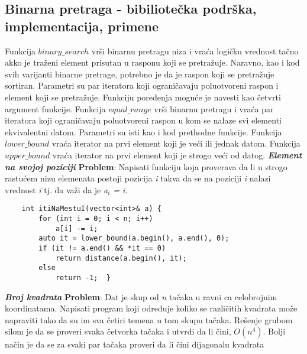 \documentclass{article}
\begin{document}
\subsection{Binarna pretraga - bibiliotečka podrška, implementacija, primene}
Funkcija $binary\_search$ vrši binarnu pretragu niza i vraća logičku vrednost
tačno akko je traženi element prisutan u rasponu koji se pretražuje.
Naravno, kao i kod svih varijanti binarne pretrage, potrebno je da je raspon
koji se pretražuje sortiran. Parametri su par iteratora koji ograničavaju
poluotvoreni raspon i element koji se pretražuje. Funkciju poređenja
moguće je navesti kao četvrti argument funkcije.
\newline Funkcija $equal\_range$ vrši binarnu pretragu i vraća par iteratora koji
ograničavaju poluotvoreni raspon u kom se nalaze svi elementi ekvivalentni
datom. Parametri su isti kao i kod prethodne funkcije.
\newline Funkcija $lower\_bound$ vraća iterator na prvi element koji je veći ili jednak
datom. 
\newline Funkcija $upper\_bound$ vraća iterator na prvi element koji je strogo veći
od datog.
\vspace{0.2cm}\newline
\textit{\textbf{Element na svojoj poziciji}}
\vspace{0.1cm}\newline
\textbf{Problem}: Napisati funkciju koja proverava da li u strogo rastućem nizu elemenata postoji pozicija \textit{i} takva da se na poziciji \textit{i} nalazi vrednost \textit{i} tj. da važi da
je \textit{a$_i$ = i}.
\begin{lstlisting}
    int itiNaMestuI(vector<int>& a) {
        for (int i = 0; i < n; i++)
            a[i] -= i;
        auto it = lower_bound(a.begin(), a.end(), 0);
        if (it != a.end() && *it == 0)
            return distance(a.begin(), it);
        else
            return -1;  }
\end{lstlisting}
\textit{\textbf{Broj kvadrata}}
\vspace{0.1cm}\newline
\textbf{Problem}: Dat je skup od \textit{n} tačaka u ravni ca celobrojnim koordinatama.
Napisati program koji određuje koliko se različitih kvadrata može napraviti tako
da su im sva četiri temena u tom skupu tačaka.
\newline
Rešenje grubom silom je da se proveri svaka četvorka tačaka i utvrdi da li čini, $O(n^4)$. Bolji način je da se za svaki par tačaka proveri da li čini dijagonalu kvadrata
\end{document}
